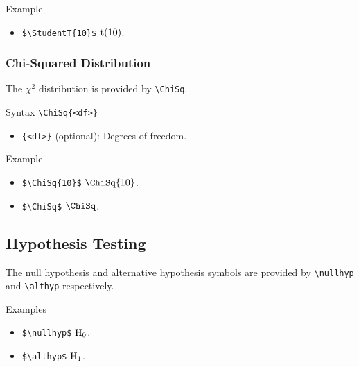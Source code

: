 \begin{myframe}{Example }
    \begin{itemize}
        \item \verb|$\StudentT{10}$| \produces{} ${\mathrm{t}}{\left( 10 \right)}$.
    \end{itemize}
\end{myframe}

\subsubsection{Chi-Squared Distribution}

The $\chi^2$ distribution is provided by \verb|\ChiSq|.

\begin{myframe}{Syntax }
    \verb|\ChiSq{<df>}|
    \begin{itemize}
        \item \verb|{<df>}| (optional): Degrees of freedom.
    \end{itemize}
\end{myframe}

\begin{myframe}{Example }
    \begin{itemize}
        \item \verb|$\ChiSq{10}$| \produces{} $\ChiSq{10}$.
        \item \verb|$\ChiSq$| \produces{} $\ChiSq$.
    \end{itemize}
\end{myframe}

\subsection{Hypothesis Testing}

The null hypothesis and alternative hypothesis symbols are provided by \verb|\nullhyp| and \verb|\althyp| respectively.

\begin{myframe}{Examples}
    \begin{itemize}
        \item \verb|$\nullhyp$| \produces{} $\mathrm{H}_0$.
        \item \verb|$\althyp$| \produces{} $\mathrm{H}_1$.
    \end{itemize}
\end{myframe}